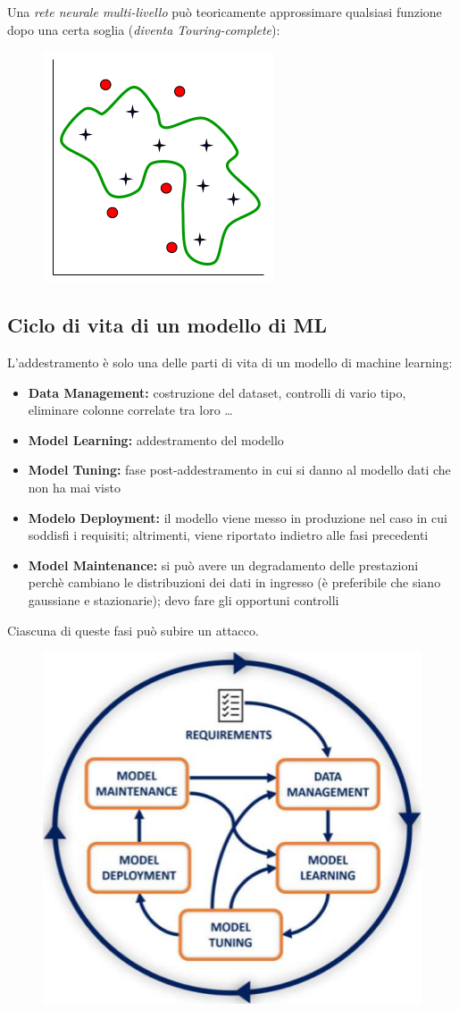 \documentclass{report}
\begin{document}
\noindent Una \textit{rete neurale multi-livello} può teoricamente approssimare qualsiasi funzione dopo 
una certa soglia (\textit{diventa Touring-complete}):

\begin{figure}[H]
    \centering
    \includegraphics[width=0.4\linewidth]{images/touring-completo.png}
\end{figure}

\subsection{Ciclo di vita di un modello di ML}
L'addestramento è solo una delle parti di vita di un modello di machine learning:
\begin{itemize}
    \item \textbf{Data Management:} costruzione del dataset, controlli di vario tipo, eliminare colonne correlate tra loro \dots
    \item \textbf{Model Learning:} addestramento del modello 
    \item \textbf{Model Tuning:} fase post-addestramento in cui si danno al modello dati che non ha mai visto 
    \item \textbf{Modelo Deployment:} il modello viene messo in produzione nel caso in cui soddisfi i requisiti; altrimenti, viene 
    riportato indietro alle fasi precedenti
    \item \textbf{Model Maintenance:} si può avere un degradamento delle prestazioni perchè cambiano le distribuzioni dei dati in ingresso (è 
    preferibile che siano gaussiane e stazionarie); devo fare gli opportuni controlli 
\end{itemize} 

\noindent Ciascuna di queste fasi può subire un attacco.

\begin{figure}[H]
    \centering
    \includegraphics[width=0.6\linewidth]{images/ml-life-cycle.png}
\end{figure}
\end{document}
